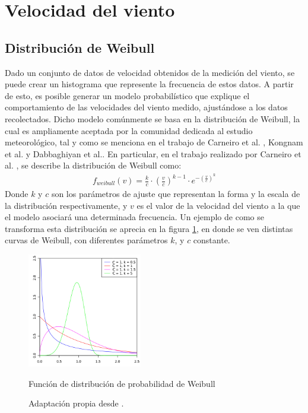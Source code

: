 \section{Velocidad del viento}
\subsection{Distribución de Weibull}
Dado un conjunto de datos de velocidad obtenidos de la medición del viento, se puede crear un histograma que represente la frecuencia de estos datos. A partir de esto, es posible generar un modelo probabilístico que explique el comportamiento de las velocidades del viento medido, ajustándose a los datos recolectados. Dicho modelo comúnmente se basa en la distribución de Weibull, la cual es ampliamente aceptada por la comunidad dedicada al estudio meteorológico, tal y como se menciona en el trabajo de Carneiro et al. \cite{Carneiro15}, Kongnam et al. \cite{Kongnam15} y Dabbaghiyan et al.\cite{Dabbaghiyan15}. En particular, en el trabajo realizado por Carneiro et al. \cite{Carneiro15}, se describe la distribución de Weibull como: 
 \begin{align}\label{eq:weibull}
     f_{weibull}(v) = \frac{k}{c} \cdot (\frac{v}{c})^{k-1} \cdot e^{-(\frac{v}{c})^ k}
 \end{align}
 Donde $k$ y $c$ son los parámetros de ajuste que representan la forma y la escala de la distribución respectivamente, y $v$ es el valor de la velocidad del viento a la que el modelo asociará una determinada frecuencia. Un ejemplo de como se transforma esta distribución se aprecia en la figura \ref{fig:weibull_fig}, en donde se ven distintas curvas de Weibull, con diferentes parámetros $k$, y $c$ constante.
\begin{figure}[h!]
    \centering    
    \includegraphics[height=50mm]{figures/weibull_distribution.png} 
    \caption{Función de distribución de probabilidad de Weibull}
    \vspace{-.25cm} 
    \caption*{Adaptación propia desde \cite{wikiWeibull}.}
    \label{fig:weibull_fig}
\end{figure}
